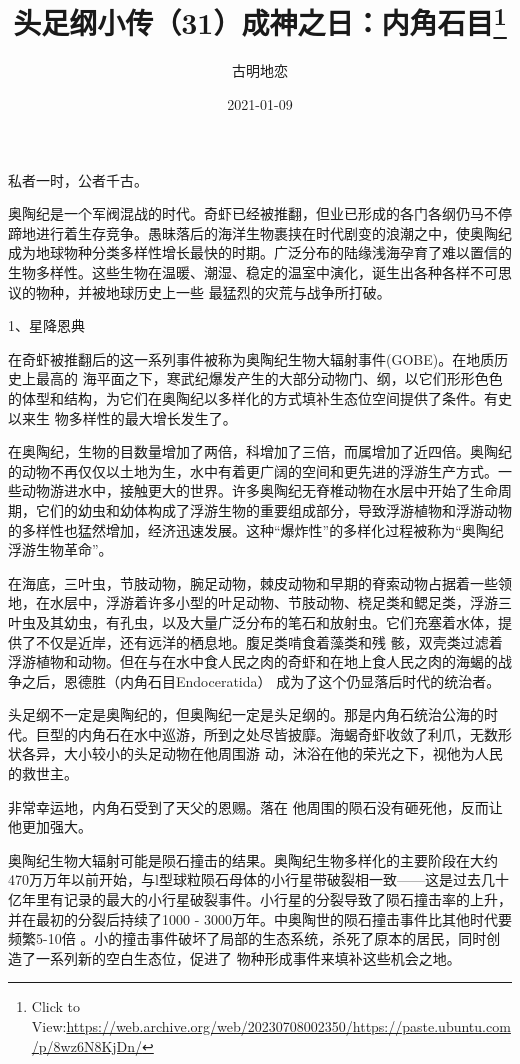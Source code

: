 \documentclass{article}
\title{头足纲小传（31）成神之日：内角石目\footnote{Click to View:\url{https://web.archive.org/web/20230708002350/https://paste.ubuntu.com/p/8wz6N8KjDn/}}}
\author{古明地恋}
\date{2021-01-09}
\begin{document}

\maketitle


\Large


﻿私者一时，公者千古。 

奥陶纪是一个军阀混战的时代。奇虾已经被推翻，但业已形成的各门各纲仍马不停蹄地进行着生存竞争。愚昧落后的海洋生物裹挟在时代剧变的浪潮之中，使奥陶纪成为地球物种分类多样性增长最快的时期。广泛分布的陆缘浅海孕育了难以置信的生物多样性。这些生物在温暖、潮湿、稳定的温室中演化，诞生出各种各样不可思议的物种，并被地球历史上一些
最猛烈的灾荒与战争所打破。 


1、星降恩典 

在奇虾被推翻后的这一系列事件被称为奥陶纪生物大辐射事件(GOBE)。在地质历史上最高的
\newpage
海平面之下，寒武纪爆发产生的大部分动物门、纲，以它们形形色色的体型和结构，为它们在奥陶纪以多样化的方式填补生态位空间提供了条件。有史以来生
物多样性的最大增长发生了。 

在奥陶纪，生物的目数量增加了两倍，科增加了三倍，而属增加了近四倍。奥陶纪的动物不再仅仅以土地为生，水中有着更广阔的空间和更先进的浮游生产方式。一些动物游进水中，接触更大的世界。许多奥陶纪无脊椎动物在水层中开始了生命周期，它们的幼虫和幼体构成了浮游生物的重要组成部分，导致浮游植物和浮游动物的多样性也猛然增加，经济迅速发展。这种“爆炸性”的多样化过程被称为“奥陶纪
浮游生物革命”。 

在海底，三叶虫，节肢动物，腕足动物，棘皮动物和早期的脊索动物占据着一些领地，在水层中，浮游着许多小型的叶足动物、节肢动物、桡足类和鳃足类，浮游三叶虫及其幼虫，有孔虫，以及大量广泛分布的笔石和放射虫。它们充塞着水体，提供了不仅是近岸，还有远洋的栖息地。腹足类啃食着藻类和残
\newpage
骸，双壳类过滤着浮游植物和动物。但在与在水中食人民之肉的奇虾和在地上食人民之肉的海蝎的战争之后，恩德胜（内角石目Endoceratida）
成为了这个仍显落后时代的统治者。 

头足纲不一定是奥陶纪的，但奥陶纪一定是头足纲的。那是内角石统治公海的时代。巨型的内角石在水中巡游，所到之处尽皆披靡。海蝎奇虾收敛了利爪，无数形状各异，大小较小的头足动物在他周围游
动，沐浴在他的荣光之下，视他为人民的救世主。 

非常幸运地，内角石受到了天父的恩赐。落在
他周围的陨石没有砸死他，反而让他更加强大。 

奥陶纪生物大辐射可能是陨石撞击的结果。奥陶纪生物多样化的主要阶段在大约470万万年以前开始，与l型球粒陨石母体的小行星带破裂相一致——这是过去几十亿年里有记录的最大的小行星破裂事件。小行星的分裂导致了陨石撞击率的上升，并在最初的分裂后持续了1000 - 3000万年。中奥陶世的陨石撞击事件比其他时代要频繁5-10倍
\newpage
。小的撞击事件破坏了局部的生态系统，杀死了原本的居民，同时创造了一系列新的空白生态位，促进了
物种形成事件来填补这些机会之地。 
\end{document}
